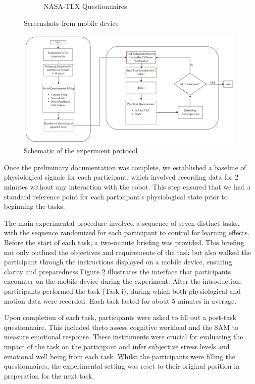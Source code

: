 \begin{figure}[h]
\begin{subfigure}[b]{0.45\columnwidth}
        \caption{NASA-TLX Questionnaires}
        \label{fig:phone2}
    \end{subfigure}
    \caption{Screenshots from mobile device}
    \label{fig:phone}
\end{figure}

\begin{figure}[h]
	\centering
	\includegraphics[width=1.1\columnwidth]{images/expflow.png}
	\caption{Schematic of the experiment protocol}
	\label{fig:prot}
\end{figure}

Once the preliminary documentation was complete, we established a baseline of physiological signals for each participant, which involved recording data for 2 minutes without any interaction with the cobot. This step ensured that we had a standard reference point for each participant's physiological state prior to beginning the tasks.

The main experimental procedure involved a sequence of seven distinct tasks, with the sequence randomized for each participant to control for learning effects.
Before the start of each task, a two-minute briefing was provided. This briefing not only outlined the objectives and requirements of the task but also walked the participant through the instructions displayed on a mobile device, ensuring clarity and preparedness.Figure \ref{fig:phone} illustrates the interface that participants encounter on the mobile device during the experiment. After the introduction, participants performed the task (Task i), during which both physiological and motion data were recorded. Each task lasted for about 5 minutes in average.



Upon completion of each task, participants were asked to fill out a post-task questionnaire. This included theto assess cognitive workload and the \gls{SAM} to measure emotional response. These instruments were crucial for evaluating the impact of the task on the participant and infer subjective stress levels and emotional well being from each task. Whilst the participants were filling the questionnaires, the experimental setting was reset to their original position in preperation for the next task.

